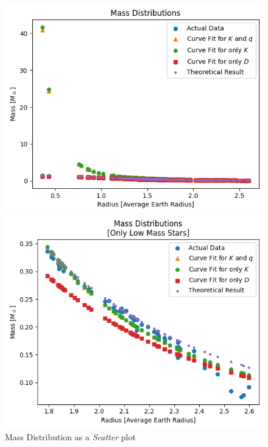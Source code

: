 \documentclass[letterpaper,12pt]{article}
\begin{document}
\begin{figure}[H]
\begin{minipage}{.5\textwidth}
\centerline{\includegraphics[width=\linewidth]{figures/appendix/2_2_11_n_s_ms_r.png}}
\end{minipage}
\begin{minipage}{.5\textwidth}
\centerline{\includegraphics[width=\linewidth]{figures/appendix/2_2_12_n_s_ms_r_.png}}
\end{minipage}
\caption{Mass Distribution as a \textit{Scatter} plot}
\end{figure}
\end{document}
